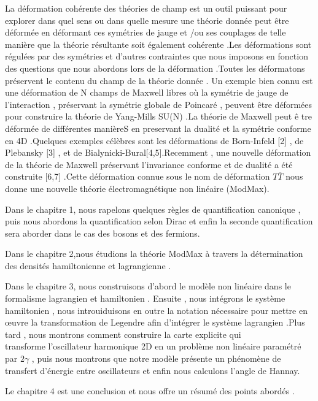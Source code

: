 \documentclass[12pt,a4paper, openany]{article}
\begin{document}
	\hspace{0.5cm}La déformation cohérente des théories de champ est un outil puissant pour explorer dans quel sens ou dans quelle mesure une théorie donnée peut \^{e}tre déformée en déformant ces symétries de jauge  et /ou ses couplages de telle manière que la théorie résultante soit également cohérente .Les déformations sont régulées par des symétries et d'autres contraintes que nous imposons en fonction des questions que nous abordons lors de la déformation .Toutes les déformatons préservent le contenu du champ de la théorie donnée . Un exemple bien connu est une déformation de N champs de Maxwell libres où la symétrie de jauge de l'interaction , préservant la symétrie  globale de Poincaré , peuvent \^{e}tre déformées pour construire la théorie de Yang-Mills SU(N) .La théorie de Maxwell peut  \^{e} tre déformée de différentes manièreS en preservant la dualité et la symétrie conforme en 4D .Quelques exemples célèbres sont les déformations de Born-Infeld [2] , de Plebansky [3] , et de Bialynicki-Bural[4,5].Recemment , une nouvelle déformation de la théorie de Maxwell préservant l'invariance conforme et de dualité a été construite [6,7] .Cette déformation connue sous le nom de déformation $T\overline{T}$ nous donne une nouvelle théorie électromagnétique non linéaire (ModMax).
	
	Dans le chapitre 1, nous rapelons quelques règles de  quantification canonique , puis nous abordons la quantification selon Dirac et enfin la seconde quantification sera aborder dans le cas des bosons et des fermions.
	
	Dans le chapitre 2,nous étudions la théorie ModMax à travers la détermination  des densités hamiltonienne et lagrangienne .
	
	Dans le chapitre 3, nous construisons d'abord le modèle non linéaire dans le formalisme lagrangien et hamiltonien . Ensuite , nous intégrons le système hamiltonien , nous introuiduisons en outre la notation nécessaire pour mettre en \oe{}uvre la transformation de Legendre afin d'intégrer le système lagrangien .Plus tard , nous montrons comment construire la carte explicite qui\\ transforme l'oscillateur harmonique 2D en un problème non linéaire paramétré par $2\gamma$ , puis nous montrons que notre modèle présente un phénomène de transfert d'énergie entre oscillateurs et enfin nous calculons l'angle de Hannay. 
	 
	Le chapitre 4 est une conclusion et nous offre un résumé des points abordés .     
	
\end{document}
